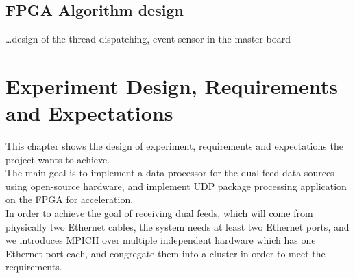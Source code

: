 \documentclass[11pt,openright,a4paper]{report}
\begin{document}
\section{FPGA Algorithm design}
\dots design of the thread dispatching, event sensor in the master board

\chapter{Experiment Design, Requirements and Expectations}
This chapter shows the design of experiment, requirements and expectations the project wants to achieve. \\
The main goal is to implement a data processor for the dual feed data sources using open-source hardware, and implement UDP package processing application on the FPGA for acceleration.\\
In order to achieve the goal of receiving dual feeds, which will come from physically two Ethernet cables, the system needs at least two Ethernet ports, and we introduces MPICH over multiple independent hardware which has one Ethernet port each, and congregate them into a cluster in order to meet the requirements.\\
\newpage
\end{document}
